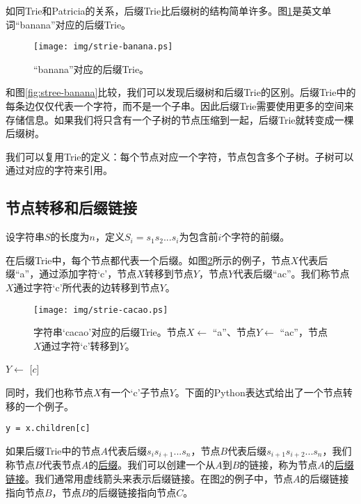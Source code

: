 \documentclass[UTF8]{article}
\begin{document}
如同Trie和Patricia的关系，后缀Trie比后缀树的结构简单许多。图\ref{fig:strie-banana}是英文单词“banana”对应的后缀Trie。

\begin{figure}[htbp]
  \centering
  \texttt{[image: img/strie-banana.ps]}
  \caption{“banana”对应的后缀Trie。} \label{fig:strie-banana}
\end{figure}

和图\ref{fig:stree-banana}比较，我们可以发现后缀树和后缀Trie的区别。后缀Trie中的每条边仅仅代表一个字符，而不是一个子串。因此后缀Trie需要使用更多的空间来存储信息。如果我们将只含有一个子树的节点压缩到一起，后缀Trie就转变成一棵后缀树。

我们可以复用Trie的定义：每个节点对应一个字符，节点包含多个子树。子树可以通过对应的字符来引用。

\subsection{节点转移和后缀链接}

设字符串$S$的长度为$n$，定义$S_i=s_1s_2...s_i$为包含前$i$个字符的前缀。

在后缀Trie中，每个节点都代表一个后缀。如图\ref{fig:strie-cacao}所示的例子，节点$X$代表后缀“a”，通过添加字符‘c’，节点$X$转移到节点$Y$，节点$Y$代表后缀“ac”。我们称节点$X$通过字符‘c’所代表的边转移到节点$Y$\cite{ukkonen95}。

\begin{figure}[htbp]
  \centering
  \texttt{[image: img/strie-cacao.ps]}
  \caption{字符串‘cacao’对应的后缀Trie。节点$X \gets$ “a”、节点$Y \gets$ “ac”，节点$X$通过字符‘c’转移到$Y$。}
  \label{fig:strie-cacao}
\end{figure}

\begin{algorithmic}
\State $Y \gets$ [$c$]
\end{algorithmic}

同时，我们也称节点$X$有一个‘c’子节点$Y$。下面的Python表达式给出了一个节点转移的一个例子。

\lstset{language=python}
\begin{lstlisting}
y = x.children[c]
\end{lstlisting}

如果后缀Trie中的节点$A$代表后缀$s_is_{i+1}...s_n$，节点$B$代表后缀$s_{i+1}s_{i+2}...s_n$，我们称节点$B$代表节点$A$的\underline{后缀}。我们可以创建一个从$A$到$B$的链接，称为节点$A$的\underline{后缀链接}\cite{ukkonen95}。我们通常用虚线箭头来表示后缀链接。在图\ref{fig:strie-cacao}的例子中，节点$A$的后缀链接指向节点$B$，节点$B$的后缀链接指向节点$C$。
\end{document}
